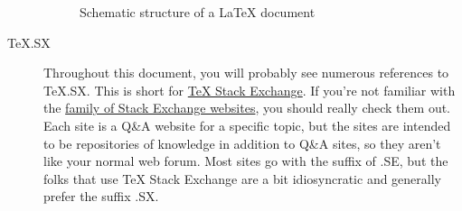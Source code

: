 \begin{description}
{		\begin{figure}[htbp]
			\centering
			\caption{Schematic structure of a \LaTeX{} document}
			\label{fig:document-structure}
		\end{figure}
	}

	\item[TeX.SX]{%
		Throughout this document, you will probably see numerous references to TeX.SX.
		This is short for \href{http://tex.stackexchange.com/}{TeX Stack Exchange}.
		If you're not familiar with the \href{http://stackexchange.com/sites#traffic}{family of Stack Exchange websites}, you should really check them out.
		Each site is a Q\&A website for a specific topic, but the sites are intended to be repositories of knowledge in addition to Q\&A sites, so they aren't like your normal web forum.
		Most sites go with the suffix of .SE, but the folks that use TeX Stack Exchange are a bit idiosyncratic and generally prefer the suffix .SX.%
	}

\end{description}